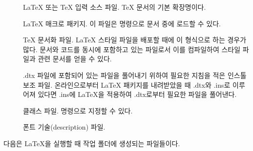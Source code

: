 

\begin{description}

\item[] \LaTeX{} 또는 \TeX{} 입력 소스 파일. \TeX{} 문서의 기본 확장명이다.
\item[] \LaTeX{} 매크로 패키지.
  이 파일은  명령으로 문서 중에 로드할 수 있다.
\item[] 
  \TeX{} 문서화 파일. \LaTeX{} 스타일 파일을 배포할 때에 이 형식으로 하는 경우가 많다.
  문서와 코드를 동시에 포함하고 있는 파일로서 이를
  컴파일하여 스타일 파일과 관련 문서를 얻을 수 있다.
\item[] 
  .dtx 파일에 포함되어 있는 파일을 풀어내기 위하여 필요한 지침을 적은 
  인스톨 보조 파일. 온라인으로부터 \LaTeX{} 패키지를 내려받았을 때 
  .dtx와 .ins로 이루어져 있다면 .ins에 \LaTeX 을 적용하여 
  .dtx로부터 필요한 파일을 풀어낸다.
\item[]
  클래스 파일.  명령으로 지정할 수 있다.
\item[] 
  폰트 기술(description) 파일. 
\end{description}



다음은 \LaTeX 을 실행할 때 작업 폴더에 생성되는 파일들이다.

